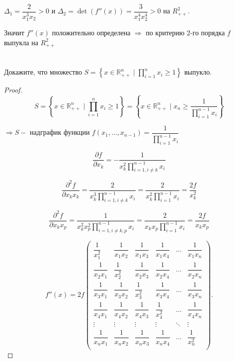 \documentclass[a4paper,12pt]{article}
\newcommand{\p}{\partial}
\newcommand{\fr}{\frac}
\newcommand{\dfr}{\dfrac}
\begin{document}
$\Delta_1 = \dfr{2}{x_1^3x_2} > 0$ и $\Delta_2= \det(f''(x)) = \dfr{3}{x_1^4x_2^4} > 0$ на $R^2_{++}$. 

Значит $f''(x)$ положительно определена $\Rightarrow$ по критерию 2-го порядка $f$ выпукла на $R^2_{++}$


\section{}

Докажите, что множество $S = \left\{ x \in \mathbb{R}^n_{++} \mid \prod\limits_{i=1}^n x_i \geq 1 \right\}$ выпукло.

\vspace{\baselineskip}

\begin{proof}

$$S = \left\{ x \in \mathbb{R}^n_{++} \mid \prod\limits_{i=1}^n x_i \geq 1 \right\} =\left\{ x \in \mathbb{R}^n_{++} \mid x_n \geq \fr{1}{\prod\limits_{i=1}^{n-1}x_i}
 \right\} $$

$\Rightarrow S - $ надграфик функции $f(x_1,\dots, x_{n-1}) = \dfr{1}{\prod\limits_{i=1}^{n-1}x_i}$

$$\fr{\p f}{\p x_k} = -\fr{1}{x_k^2 \prod\limits_{i = 1, i \neq k}^{n-1}x_i}$$

$$\fr{\p^2 f}{\p x_k x_k} = \fr{2}{x_k^3 \prod\limits_{i = 1, i \neq k}^{n-1}x_i} = \fr{2}{x_k^2 \prod\limits_{i = 1}^{n-1}x_i}  = \fr{2f}{x_k^2}$$

$$\fr{\p^2 f}{\p x_k x_p} = \fr{1}{x_k^2 x_p^2 \prod\limits_{i = 1, i \neq k, p }^{n-1}x_i}= \fr{2}{x_k x_p \prod\limits_{i = 1}^{n-1}x_i}  = \fr{2f}{x_k x_p}$$


$$f''(x) = 2f
\begin{pmatrix}
\dfr{1}{x_1^2} & \dfr{1}{x_1 x_2}& \dfr{1}{x_1 x_3}&\dfr{1}{x_1 x_4}&\dots& \dfr{1}{x_1 x_n}\\
\dfr{1}{x_2 x_1} & \dfr{1}{x_2^2}& \dfr{1}{x_2 x_3}&\dfr{1}{x_2 x_4}&\dots& \dfr{1}{x_2 x_n}\\
\dfr{1}{x_3 x_1} & \dfr{1}{x_3 x_2}& \dfr{1}{x_3^2}&\dfr{1}{x_3 x_4}&\dots& \dfr{1}{x_3 x_n}\\
\dfr{1}{x_4 x_1} & \dfr{1}{x_4 x_2}& \dfr{1}{x_4 x_3}&\dfr{1}{x_4^2}&\dots& \dfr{1}{x_4 x_n}\\
\vdots&\vdots&\vdots&\vdots&\ddots&\vdots\\
\dfr{1}{x_n x_1} & \dfr{1}{x_n x_2}& \dfr{1}{x_n x_3}&\dfr{1}{x_n x_4}&\dots& \dfr{1}{x_n ^2}\\
\end{pmatrix}.$$


\end{proof}
\end{document}
